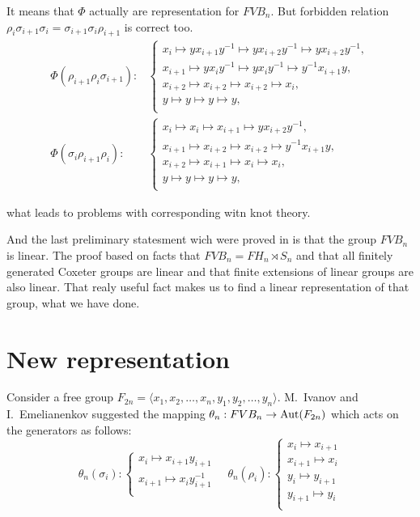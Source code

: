 \documentclass{article}
\begin{document}
It means that $\Phi$ actually are representation for $FVB_n$. But forbidden relation $\rho_i\sigma_{i+1}\sigma_i = \sigma_{i+1}\sigma_i\rho_{i+1}$ is correct too.
\begin{align*}
\Phi(\rho_{i+1}\rho_i\sigma_{i+1}):&
\begin{cases}
x_i \mapsto yx_{i+1}y^{-1} \mapsto yx_{i+2}y^{-1} \mapsto yx_{i+2}y^{-1},\\
x_{i+1} \mapsto yx_iy^{-1} \mapsto yx_iy^{-1} \mapsto y^{-1}x_{i+1}y,\\
x_{i+2} \mapsto x_{i+2} \mapsto x_{i+2} \mapsto x_i,\\
y \mapsto y\mapsto y \mapsto y, \\
\end{cases} \\
\Phi(\sigma_i\rho_{i+1}\rho_i):&
\begin{cases}
x_i \mapsto x_i \mapsto x_{i+1}  \mapsto yx_{i+2}y^{-1},\\
x_{i+1} \mapsto x_{i+2} \mapsto x_{i+2} \mapsto y^{-1}x_{i+1}y,\\
x_{i+2} \mapsto x_{i+1} \mapsto x_i\mapsto x_i,\\
y \mapsto y\mapsto y \mapsto y, \\
\end{cases}
\end{align*}

 what leads to problems with corresponding witn knot theory. 

\vspace{6pt}And the last preliminary statesment wich were proved in \cite{BarBelDom} is that the group $FVB_n$ is linear. The proof based on facts that $FVB_n = FH_n \rtimes S_n$ and that all finitely generated Coxeter groups are linear and that finite extensions of linear groups are also linear. That realy useful fact makes us to find a linear representation of that group, what we have done.

\section{New representation}

Consider a free group $F_{2n}=\langle x_1, x_2,\ldots , x_n, y_1, y_2, \ldots , y_n \rangle$. M.~Ivanov and I.~Emelianenkov suggested the mapping $\theta_n:FVB_n \rightarrow {\rm Aut}(F_{2n})$ which acts on the generators as follows:
$$
\theta_n(\sigma_i):
\begin{cases}
x_i \mapsto x_{i+1}y_{i+1}\\
x_{i+1} \mapsto x_iy_{i+1}^{-1}\\
\end{cases}\quad
\theta_n(\rho_i):
\begin{cases}
x_i \mapsto x_{i+1}\\
x_{i+1} \mapsto x_i\\
y_i \mapsto y_{i+1}\\
y_{i+1} \mapsto y_i\\
\end{cases}
$$
\end{document}
